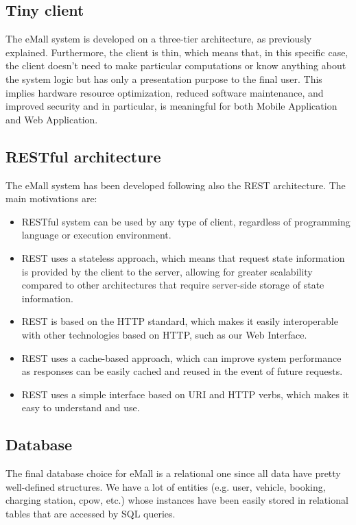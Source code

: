 \documentclass[a4paper]{report}
\begin{document}
\subsection{Tiny client}
The eMall system is developed on a three-tier architecture, as previously explained. Furthermore, the client is thin, which means that, in this specific case, the client doesn't need to make particular computations or know anything about the system logic but has only a presentation purpose to the final user. This implies hardware resource optimization, reduced software maintenance, and improved security and in particular, is meaningful for both Mobile Application and Web Application.

\subsection{RESTful architecture}
The eMall system has been developed following also the REST architecture. The main motivations are:
\begin{itemize}
    \item RESTful system can be used by any type of client, regardless of programming language or execution environment.
    \item REST uses a stateless approach, which means that request state information is provided by the client to the server, allowing for greater scalability compared to other architectures that require server-side storage of state information.
    \item REST is based on the HTTP standard, which makes it easily interoperable with other technologies based on HTTP, such as our Web Interface.
    \item REST uses a cache-based approach, which can improve system performance as responses can be easily cached and reused in the event of future requests.
    \item REST uses a simple interface based on URI and HTTP verbs, which makes it easy to understand and use.
\end{itemize}

\subsection{Database}
The final database choice for eMall is a relational one since all data have pretty well-defined structures. We have a lot of entities (e.g. user, vehicle, booking, charging station, cpow, etc.) whose instances have been easily stored in relational tables that are accessed by SQL queries.
\end{document}
